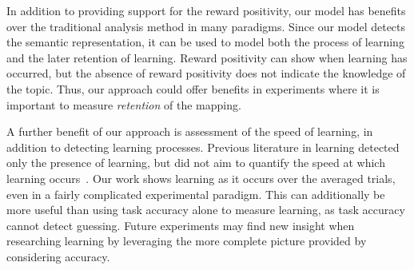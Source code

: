 In addition to providing support for the reward positivity, our model has 
benefits over the traditional analysis method in many paradigms. Since our 
model detects the semantic representation, it can be used to model both the 
process of learning and the later retention of learning.  Reward positivity can 
show when learning has occurred, but the absence of reward positivity does not 
indicate the knowledge of the topic.  Thus, our approach could offer benefits 
in experiments where it is important to measure \emph{retention} of the 
mapping.

A further benefit of our approach is assessment of the speed of learning, in 
addition to detecting learning processes. Previous literature in learning 
detected only the presence of learning, but did not aim to quantify the speed 
at which learning occurs~\cite{krigolson2014we}. Our work shows learning as it 
occurs over the averaged trials, even in a fairly complicated experimental 
paradigm. This can additionally be more useful than using task accuracy alone 
to measure learning, as task accuracy cannot detect guessing. Future 
experiments may find new insight when researching learning by leveraging the 
more complete picture provided by considering \tvt accuracy.
